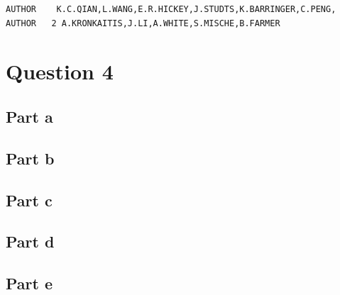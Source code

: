 \documentclass[11pt, a4paper,titlepage]{article}
\begin{document}
\begin{verbatim}
AUTHOR    K.C.QIAN,L.WANG,E.R.HICKEY,J.STUDTS,K.BARRINGER,C.PENG,               
AUTHOR   2 A.KRONKAITIS,J.LI,A.WHITE,S.MISCHE,B.FARMER         
\end{verbatim}
 
\section{Question 4}
\subsection{Part a}
\subsection{Part b}
\subsection{Part c}
\subsection{Part d}
\subsection{Part e}


\end{document}
